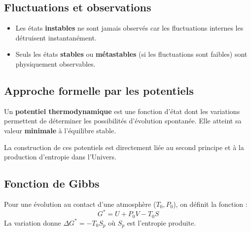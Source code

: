 \documentclass[french]{yLectureNote}
\begin{document}



\subsection{Fluctuations et observations}



\begin{itemize}
    \item Les états \textbf{instables} ne sont jamais observés car les fluctuations internes les détruisent instantanément.
    \item Seuls les états \textbf{stables} ou \textbf{métastables} (si les fluctuations sont faibles) sont physiquement observables.
\end{itemize}

\subsection{Approche formelle par les potentiels}

\begin{definition}
Un \textbf{potentiel thermodynamique} est une fonction d'état dont les variations permettent de déterminer les possibilités d'évolution spontanée. Elle atteint sa valeur \textbf{minimale} à l'équilibre stable.
\end{definition}

La construction de ces potentiels est directement liée au second principe et à la production d'entropie dans l'Univers.



\subsection{Fonction de Gibbs}


Pour une évolution au contact d'une atmosphère ($T_0, P_0$), on définit la fonction :
$$G^* = U + P_0V - T_0S$$
La variation donne $\Delta G^* = -T_0 S_{p}$ où $S_p$ est l'entropie produite.
\end{document}
